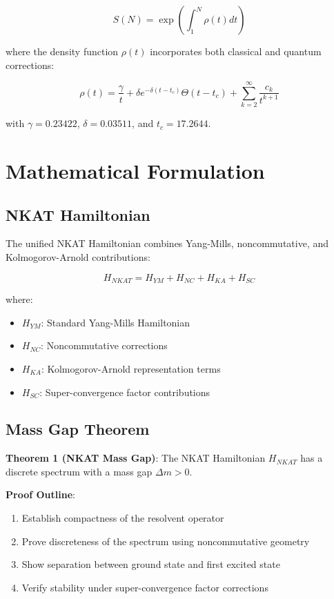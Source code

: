 \documentclass[12pt,a4paper]{article}
\begin{document}
$$S(N) = \exp\left(\int_1^N \rho(t) dt\right)$$

where the density function $\rho(t)$ incorporates both classical and quantum corrections:

$$\rho(t) = \frac{\gamma}{t} + \delta e^{-\delta(t-t_c)} \Theta(t-t_c) + \sum_{k=2}^\infty \frac{c_k}{t^{k+1}}$$

with $\gamma = 0.23422$, $\delta = 0.03511$, and $t_c = 17.2644$.

\section{Mathematical Formulation}

\subsection{NKAT Hamiltonian}

The unified NKAT Hamiltonian combines Yang-Mills, noncommutative, and Kolmogorov-Arnold contributions:

$$H_{NKAT} = H_{YM} + H_{NC} + H_{KA} + H_{SC}$$

where:
\begin{itemize}
\item $H_{YM}$: Standard Yang-Mills Hamiltonian
\item $H_{NC}$: Noncommutative corrections
\item $H_{KA}$: Kolmogorov-Arnold representation terms
\item $H_{SC}$: Super-convergence factor contributions
\end{itemize}

\subsection{Mass Gap Theorem}

\textbf{Theorem 1 (NKAT Mass Gap)}: The NKAT Hamiltonian $H_{NKAT}$ has a discrete spectrum with a mass gap $\Delta m > 0$.

\textbf{Proof Outline}:
\begin{enumerate}
\item Establish compactness of the resolvent operator
\item Prove discreteness of the spectrum using noncommutative geometry
\item Show separation between ground state and first excited state
\item Verify stability under super-convergence factor corrections
\end{enumerate}
\end{document}
